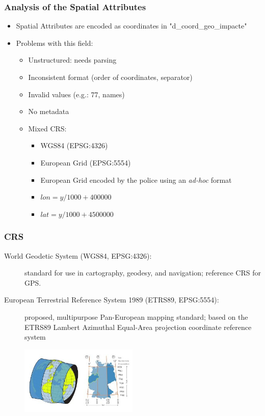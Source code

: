 \documentclass[hyperref={pdfpagelabels=true}]{beamer}
\begin{document}
\begin{frame}
\frametitle{Analysis of the Spatial Attributes}
    \begin{itemize}
      \item<1-> Spatial Attributes are encoded as coordinates in "d\_coord\_geo\_impacte"
      \item<2-> Problems with this field:
      \begin{itemize}
	\item<3->Unstructured: needs parsing
	\item<3->Inconsistent format (order of coordinates, separator)	
	\item<3->Invalid values (e.g.: 77, names)
	\item<3->No metadata	
	\item<4->Mixed CRS:
	  \begin{itemize}
	  \item<5->WGS84 (EPSG:4326)
	  \item<5->European Grid (EPSG:5554)
	  \item<5->European Grid encoded by the police using an \textit{ad-hoc} format
	    \item<6->$lon = y/ 1000 + 400000$
	    \item<6->$lat = y/ 1000 + 4500000$	    
	    \end{itemize}        		  
      \end{itemize}        
    \end{itemize}    
\end{frame}

\begin{frame}
\frametitle{CRS}
\begin{description}
  \item [World Geodetic System (WGS84, EPSG:4326):] standard for use in cartography, geodesy, and navigation; reference CRS for GPS.
  \item [European Terrestrial Reference System 1989 (ETRS89, EPSG:5554):] proposed, multipurpose Pan-European mapping standard; based on the ETRS89 Lambert Azimuthal Equal-Area projection coordinate reference system
\end{description}
      \begin{figure}  
	\includegraphics[width=0.5\textwidth]{ETRS89-2.jpg}
       \end{figure}  
\end{frame}
\end{document}
